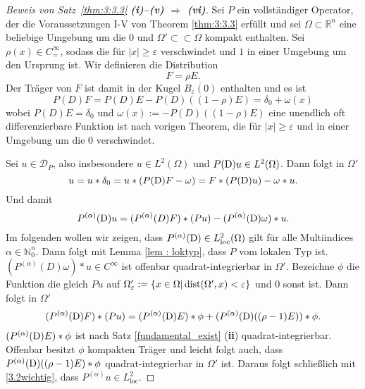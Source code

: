 %
%
%
%

\begin{proof}[Beweis von Satz~\ref{thm:3:3.3} {\bf (i)--(v) $\Longrightarrow$ (vi)}]
Sei $P$ ein vollständiger Operator, der die Voraussetzungen I-V von Theorem \ref{thm:3:3.3} erfüllt und sei $\Omega\subset \mathbb R^n$ eine beliebige Umgebung um die $0$ und $\Omega'\subset \subset \Omega$ kompakt enthalten.  Sei $\rho(x)\in C_=^\infty$, sodass die für $|x|\ge \varepsilon$ verschwindet und $1$ in einer Umgebung um den Ursprung ist. Wir definieren die Distribution
\begin{equation}
F= \rho E.
\end{equation}
Der Träger von $F$ ist damit in der Kugel $\overline {B_{\varepsilon}(0)}$ enthalten und es ist
\begin{equation}
P(D) F= P(D) E - P(D)((1-\rho)E) =\delta_0 + \omega(x)
\end{equation}  
wobei $P(D)E=\delta_0$ und $\omega(x):= -P(D)((1-\rho)E)$ eine unendlich oft differenzierbare Funktion ist nach vorigen Theorem, die für $|x|\ge \varepsilon$ und in einer Umgebung um die $0$ verschwindet.  

Sei $u\in \mathcal D_{P}$, also insbesondere $u\in L^2(\Omega)$ und $P(\mathrm D)u\in L^2(\Omega)$.  Dann folgt in $\Omega'$
\begin{equation}
u= u*\delta_0 = u * (P(\mathrm D) F-\omega) = F*(P(\mathrm D)u)- \omega *u.
\end{equation}
Und damit
\begin{equation}\label{3.2wichtig}
P^{(\alpha)}(\mathrm D) u = (P^{(\alpha)}(D)F)*(Pu)-(P^{(\alpha)}(\mathrm D) \omega)*u.
\end{equation}
Im folgenden wollen wir zeigen, dass $P^{(\alpha)}(\mathrm D)\in L^2_{\text{loc}}(\Omega)$ gilt für alle Multiindices $\alpha\in \mathbb N_0^n$. Dann folgt mit Lemma \ref{lem : loktyp}, dass $P$ vom lokalen Typ ist.  $(P^{(\alpha)}(D)\omega)*u\in C^\infty$ ist offenbar quadrat-integrierbar in $\Omega'$. 
Bezeichne $\phi$ die Funktion die gleich $Pu$ auf $\Omega'_\varepsilon:=\{x\in \Omega| \operatorname{dist}(\Omega', x)<\varepsilon\}$ und $0$ sonst ist. Dann folgt in $\Omega'$
\begin{equation}
(P^{(\alpha)}(\mathrm D)F)* (Pu) = (P^{(\alpha)}(\mathrm D)E)*\phi+ (P^{(\alpha)}(\mathrm D)((\rho-1)E))*\phi.
\end{equation}
$(P^{(\alpha)}(\mathrm D)E)*\phi$ ist nach Satz \ref{fundamental_exist} ({\bf ii}) quadrat-integrierbar. Offenbar besitzt $\phi$ kompakten Träger und leicht folgt auch, dass $P^{(\alpha)}(\mathrm D)((\rho-1)E)*\phi$ quadrat-integrierbar in $\Omega'$  ist. Daraus folgt schließlich mit \eqref{3.2wichtig}, dass $P^{(\alpha)}u\in L^2_{\text{loc}}$.
\end{proof}


